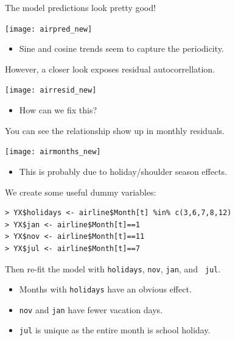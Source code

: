 \documentclass[12pt,xcolor=svgnames]{beamer}
\newcommand{\rd}{\color{red}}
\newcommand{\bl}{\color{blue}}
\newcommand{\sk}{\vspace{.4cm}}
\newcommand{\nochap}{\vspace{0.5cm}}
\newcommand{\nsk}{\vspace{-.4cm}}
\begin{document}
\begin{frame}
\nochap

\vspace{-0.35cm}
The model predictions look pretty good!
\begin{center}
\texttt{[image: airpred\_new]}
\end{center}

\nsk
\begin{itemize}
\item Sine and cosine trends seem to capture the periodicity.
\end{itemize}

\end{frame}


\begin{frame}
\nochap

\vspace{-0.15cm}
However, a closer look exposes residual autocorrellation.

\begin{center}
\texttt{[image: airresid\_new]}
\end{center}

\nsk
\hfill \begin{minipage}{5cm}
\begin{itemize}
\item {\rd How can we fix this?}
\end{itemize}
\end{minipage}

\end{frame}


\begin{frame}
\nochap

\vspace{-0.25cm}
You can see the relationship show up in monthly residuals.
\begin{center}
\texttt{[image: airmonths\_new]}
\end{center}
\nsk
\begin{itemize}
\item This is probably due to holiday/shoulder season effects.
\end{itemize}
\end{frame}

\begin{frame}[fragile]
\nochap

We create some useful dummy variables:
{\bl \small
\begin{verbatim}
> YX$holidays <- airline$Month[t] %in% c(3,6,7,8,12) 
> YX$jan <- airline$Month[t]==1
> YX$nov <- airline$Month[t]==11
> YX$jul <- airline$Month[t]==7
\end{verbatim}
}

\sk
Then re-fit the model with {\tt holidays}, {\tt nov}, {\tt jan}, and {\tt
  jul}.
\begin{itemize}
\item Months with {\tt\rd holidays} have an obvious effect.
\item {\tt\rd nov} and {\tt\rd jan} have fewer vacation days.
\item {\tt\rd jul} is unique as the entire month is school holiday.
\end{itemize}

\end{frame}
\end{document}
